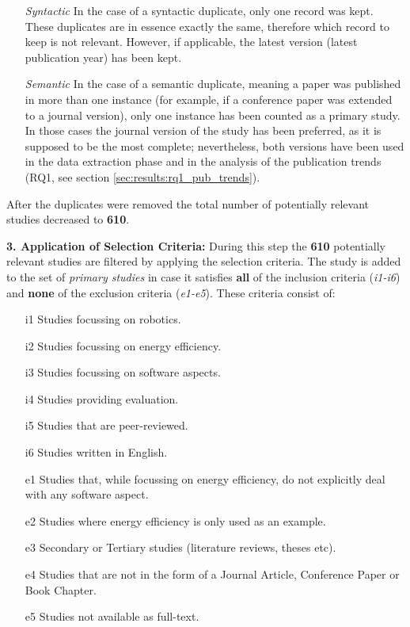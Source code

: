 \vspace{1mm}

\begin{enumerate}
    \item[\textit{Syntactic}] In the case of a syntactic duplicate, only one record was kept. 
    These duplicates are in essence exactly the same, therefore which record to keep is not relevant.
    However, if applicable, the latest version (latest publication year) has been kept.

    \item[\textit{Semantic}] In the case of a semantic duplicate, meaning a paper was published in more than one instance 
    (for example, if a conference paper was extended to a journal version), only one instance has been counted as a primary study. 
    In those cases the journal version of the study has been preferred, as it is supposed to be the most complete; nevertheless, 
    both versions have been used in the data extraction phase and in the analysis of the publication trends (RQ1, see section \ref{sec:results:rq1_pub_trends}).

\end{enumerate}
After the duplicates were removed the total number of potentially relevant studies decreased to \textbf{610}.

\vspace{5mm}

\noindent\textbf{3. Application of Selection Criteria:}
During this step the \textbf{610} potentially relevant studies are filtered by applying the selection criteria. 
The study is added to the set of \textit{primary studies} in case it satisfies \textbf{all} of the inclusion criteria (\textit{i1-i6}) 
and \textbf{none} of the exclusion criteria (\textit{e1-e5}). 
These criteria consist of:
\begin{itemize}
    \item[i1] Studies focussing on robotics.
	\item[i2] Studies focussing on energy efficiency.
    \item[i3] Studies focussing on software aspects.
    \item[i4] Studies providing evaluation.
    \item[i5] Studies that are peer-reviewed.
    \item[i6] Studies written in English.
    
	\item[e1] Studies that, while focussing on energy efficiency, do not explicitly deal with any software aspect.
    \item[e2] Studies where energy efficiency is only used as an example.
    \item[e3] Secondary or Tertiary studies (literature reviews, theses etc).
    \item[e4] Studies that are not in the form of a Journal Article, Conference Paper or Book Chapter.
    \item[e5] Studies not available as full-text.
\end{itemize}

